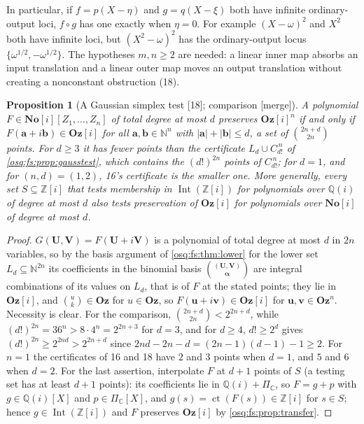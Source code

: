 \documentclass[11pt,letterpaper]{article}
\numberwithin{equation}{section}
\newtheorem{proposition}[proposition]{Proposition}
\theoremstyle{definition}
\theoremstyle{remark}
\theoremstyle{plain}
\newcommand{\No}{\mathbf{No}}
\newcommand{\Oz}{\mathbf{Oz}}
\newcommand{\SC}{\No[i]}
\newcommand{\GOz}{\Oz[i]}
\newcommand{\Z}{\mathbb Z}
\newcommand{\Q}{\mathbb Q}
\newcommand{\C}{\mathbb C}
\newcommand{\N}{\mathbb N}
\newcommand{\ct}{\operatorname{ct}}
\newcommand{\Int}{\operatorname{Int}}
\newcommand{\src}[1]{\textup{\textsf{[#1]}}}
\newcommand{\merge}{\textup{\textsf{[merge]}}}
\begin{document}
In particular, if $f=p(X-\eta)$ and $g=q(X-\xi)$ both have infinite ordinary-output loci, $f\circ g$ has one exactly when $\eta=0$. For example
$(X-\omega)^2$ and $X^2$ both have infinite loci, but $(X^2-\omega)^2$ has the ordinary-output locus $\{\omega^{1/2},-\omega^{1/2}\}$. The hypotheses
$m,n\ge2$ are needed: a linear inner map absorbs an input translation and a linear outer map moves an output translation without creating a
nonconstant obstruction (18).

\begin{proposition}[A Gaussian simplex test \src{18}; comparison \merge]\label{osq:or:prop:gausstest}
A polynomial $F\in\SC[Z_1,\dots,Z_n]$ of total degree at most $d$ preserves $\GOz^n$ if and only if $F(\mathbf a+i\mathbf b)\in\GOz$ for all
$\mathbf a,\mathbf b\in\N^n$ with $|\mathbf a|+|\mathbf b|\le d$, a set of $\binom{2n+d}{2n}$ points. For $d\ge3$ it has fewer points than the certificate
$L_d\cup C_{d!}^{\,n}$ of \cref{osq:fs:prop:gausstest}, which contains the $(d!)^{2n}$ points of $C_{d!}^{\,n}$; for $d=1$, and for $(n,d)=(1,2)$, 16's
certificate is the smaller one. More generally, every set $S\subseteq\Z[i]$ that tests membership in $\Int(\Z[i])$ for polynomials over $\Q(i)$ of
degree at most $d$ also tests preservation of $\GOz$ for polynomials over $\SC$ of degree at most $d$.
\end{proposition}
\begin{proof}
$G(\mathbf U,\mathbf V)=F(\mathbf U+i\mathbf V)$ is a polynomial of total degree at most $d$ in $2n$ variables, so by the basis argument of
\cref{osq:fs:thm:lower} for the lower set $L_d\subseteq\N^{2n}$ its coefficients in the binomial basis $\binom{(\mathbf U,\mathbf V)}{\boldsymbol\alpha}$ are
integral combinations of its values on $L_d$, that is of $F$ at the stated points; they lie in $\GOz$, and $\binom{u}{k}\in\Oz$ for $u\in\Oz$, so
$F(\mathbf u+i\mathbf v)\in\GOz$ for $\mathbf u,\mathbf v\in\Oz^n$. Necessity is clear. For the comparison, $\binom{2n+d}{2n}<2^{2n+d}$, while
$(d!)^{2n}=36^n>8\cdot4^n=2^{2n+3}$ for $d=3$, and for $d\ge4$, $d!\ge2^d$ gives $(d!)^{2n}\ge2^{2nd}>2^{2n+d}$ since $2nd-2n-d=(2n-1)(d-1)-1\ge2$. For
$n=1$ the certificates of 16 and 18 have $2$ and $3$ points when $d=1$, and $5$ and $6$ when $d=2$. For the last assertion, interpolate $F$ at $d+1$ points of
$S$ (a testing set has at least $d+1$ points): its coefficients lie in $\Q(i)+\Pi_\C$, so $F=g+p$ with $g\in\Q(i)[X]$ and $p\in\Pi_\C[X]$, and
$g(s)=\ct(F(s))\in\Z[i]$ for $s\in S$; hence $g\in\Int(\Z[i])$ and $F$ preserves $\GOz$ by \cref{osq:fs:prop:transfer}.
\end{proof}
\end{document}
